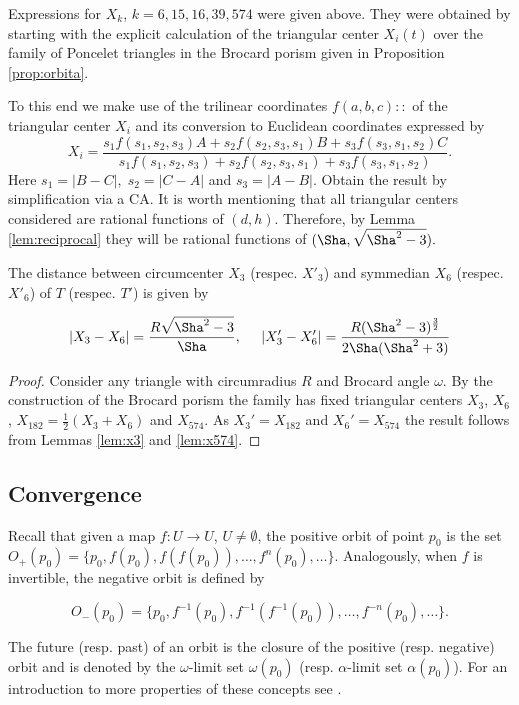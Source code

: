 Expressions for $X_k$, $k=6,15,16,39,574$ were given above. They were obtained by starting with the explicit calculation of the triangular center $X_i(t)$ over the family of Poncelet triangles in the Brocard porism given in Proposition \ref{prop:orbita}.

To this end we make use of the trilinear coordinates $f(a,b,c)::$ of  the triangular center $X_i$ \cite{etc} and its conversion to Euclidean coordinates expressed by
  \[X_i = \frac{ s_1 f(s_1,s_2,s_3) A +s_2f(s_2,s_3,s_1)B+ s_3 f(s_3,s_1,s_2) C}
  {s_1 f(s_1,s_2,s_3)+s_2f(s_2,s_3,s_1)+s_3 f(s_3,s_1,s_2)}. \]
  Here $s_1=|B-C|,\; s_2=|C-A|$ and $  s_3=|A-B|$. Obtain the result by simplification via a CA. It is worth mentioning that all triangular centers considered  are rational functions of $(d,h)$. Therefore, by Lemma \ref{lem:reciprocal} they will be rational functions of $(\Sha, \sqrt{\Sha^2-3}).$
 
 \begin{lemma}
 The distance between circumcenter $X_3$ (respec. $X'_3$) and symmedian $X_6$ (respec. $X'_6$) of $T$ (respec. $T'$) is given by

\[ |X_3-X_6|=\frac{R\sqrt{ \Sha^2 -3}}{ \Sha},\;\;\;\;\;
|X_3'-X_6'|=\frac{R(\Sha^2-3)^{\frac{3}{2}}}{2\Sha(\Sha^2+3)}
\]
 \label{lem:dX3X6}
\end{lemma}

\begin{proof} Consider any triangle with circumradius $R$ and Brocard angle $\omega$. By the construction   of the Brocard porism the family   has fixed triangular centers $X_3$,   $X_6$, $X_{182}=\frac{1}{2}(X_3+X_6)$ and $X_{574}$. As $X_3'=X_{182}$ and $X_6'=X_{574}$ the result follows from Lemmas \ref{lem:x3} and \ref{lem:x574}.
\end{proof}

\subsection*{Convergence}

 Recall that given a map $f:U\to U$, $ U\ne \emptyset$, the positive orbit of point $p_0$
 is the set $O_{+}(p_0)=\{p_0,f(p_0), f(f(p_0)),\ldots, f^n(p_0),\ldots\}.$
 Analogously, when $f$ is invertible, the negative orbit
 is defined by
 
 \[ O_{-}(p_0)=\{p_0,f^{-1}(p_0), f^{-1}(f^{-1}(p_0)),\ldots, f^{-n}(p_0),\ldots\}.\]
 
 The future (resp. past) of an orbit is the closure of 
 the positive (resp. negative) orbit and is  denoted by
 the $\omega$-limit set $\omega(p_0)$ (resp. $\alpha$-limit set $\alpha(p_0)$). For an introduction to more properties of these concepts see \cite[Chapter 1]{devaney}.

